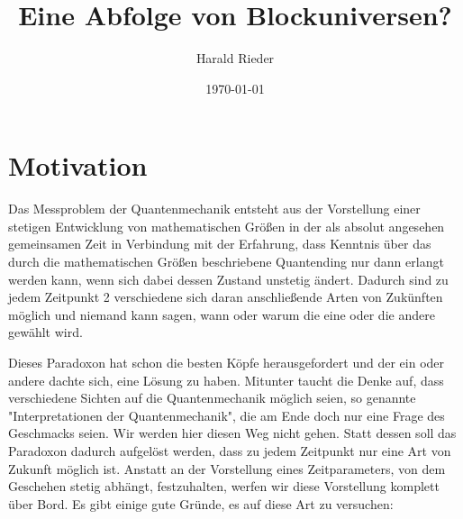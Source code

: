 \documentclass[12pt]{article}
\begin{document}
\title{\fontsize{25}{25}\selectfont \textbf{Eine Abfolge von Blockuniversen?}}
\author{Harald Rieder}
\date{\today}
\maketitle



\tableofcontents

\section{Motivation}

Das Messproblem der Quantenmechanik entsteht aus der Vorstellung einer stetigen Entwicklung von mathematischen Größen in der als absolut angesehen gemeinsamen Zeit in Verbindung mit der Erfahrung, dass Kenntnis über das durch die mathematischen Größen beschriebene Quantending nur dann erlangt werden kann, wenn sich dabei dessen Zustand unstetig ändert. Dadurch sind zu jedem Zeitpunkt 2 verschiedene sich daran anschließende Arten von Zukünften möglich und niemand kann sagen, wann oder warum die eine oder die andere gewählt wird. 

Dieses Paradoxon hat schon die besten Köpfe herausgefordert und der ein oder andere dachte sich, eine Lösung zu haben. Mitunter taucht die Denke auf, dass verschiedene Sichten auf die Quantenmechanik möglich seien, so genannte "Interpretationen der Quantenmechanik", die am Ende doch nur eine Frage des Geschmacks seien. Wir werden hier diesen Weg nicht gehen. Statt dessen soll das Paradoxon dadurch aufgelöst werden, dass zu jedem Zeitpunkt nur eine Art von Zukunft möglich ist. Anstatt an der Vorstellung eines Zeitparameters, von dem Geschehen stetig abhängt, festzuhalten, werfen wir diese Vorstellung komplett über Bord. Es gibt einige gute Gründe, es auf diese Art zu versuchen:
\end{document}
